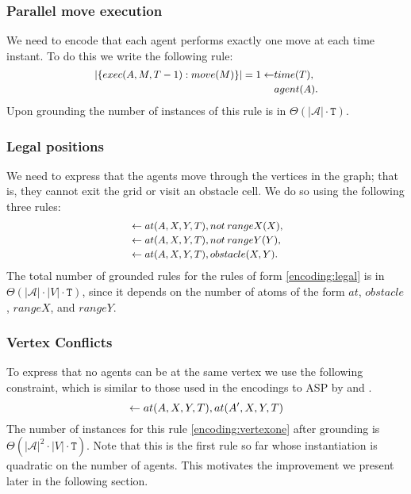 \subsubsection{Parallel move execution}
We need to encode that each agent performs exactly one move at each time instant. To do this we write the following rule:
\begin{equation}\small\label{encoding:delta}
\begin{split}
|\{exec(A,M,T-1) : move(M) \}| = 1 \leftarrow &time(T),\\&agent(A).
\end{split}
\end{equation}
Upon grounding the number of instances of this rule is in $\Theta(|\mathcal{A}|\cdot \mathtt{T})$.
\subsubsection{Legal positions}
We need to express that the agents move through the vertices in the graph; that is, they cannot exit the grid or visit an obstacle cell. We do so using the following three rules:
\begin{equation}\label{encoding:legal}\small
    \begin{split}
&\leftarrow at(A,X,Y,T), not\: rangeX(X),\\
&\leftarrow at(A,X,Y,T), not\: rangeY(Y),\\
&\leftarrow at(A,X,Y,T), obstacle(X,Y). %
    \end{split}
\end{equation}
The total number of grounded rules for the rules of form \eqref{encoding:legal} is in $\Theta(|\mathcal{A}| \cdot |V| \cdot \mathtt{T})$, since it depends on the number of atoms of the form $at$, $obstacle$, $rangeX$, and $rangeY$.

\subsubsection{Vertex Conflicts}
To express that no agents can be at the same vertex we use the following constraint, which is similar to those used in the encodings to ASP by  and .
\begin{equation}\small\label{encoding:vertexone}
    \leftarrow at(A,X,Y,T), at(A',X,Y,T)
\end{equation}
The number of instances for this rule \eqref{encoding:vertexone} after grounding is $\Theta(|\mathcal{A}|^2 \cdot |V| \cdot \mathtt{T})$. Note that this is the first rule so far whose instantiation is quadratic on the number of agents. This motivates the improvement we present later in the following section.

